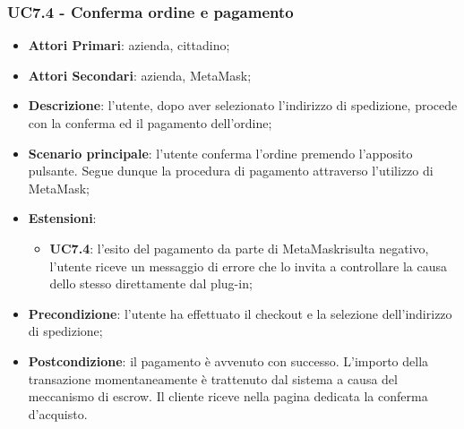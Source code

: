 \subsubsection{UC7.4 - Conferma ordine e pagamento}
\begin{itemize}
	\item \textbf{Attori Primari}: azienda, cittadino;
	\item \textbf{Attori Secondari}: azienda, MetaMask\glo;
	\item \textbf{Descrizione}: l'utente, dopo aver selezionato l'indirizzo di spedizione, procede con la conferma ed il pagamento dell'ordine;
	\item \textbf{Scenario principale}: l'utente conferma l'ordine premendo l'apposito pulsante. Segue dunque la procedura di pagamento attraverso l'utilizzo di MetaMask\glo;
	\item \textbf{Estensioni}: 
	\begin{itemize}
		\item \textbf{UC7.4}: l'esito del pagamento da parte di MetaMask\glosp risulta negativo, l'utente riceve un messaggio di errore che lo invita a controllare la causa dello stesso direttamente dal plug-in; 
	\end{itemize}
	\item \textbf{Precondizione}: l'utente ha effettuato il checkout e la selezione dell'indirizzo di spedizione;
	\item \textbf{Postcondizione}: il pagamento è avvenuto con successo. 
	L'importo della transazione momentaneamente è trattenuto dal sistema a 
	causa del meccanismo di escrow\glo. Il cliente riceve nella pagina dedicata 
	la conferma d'acquisto\glo.
\end{itemize}


